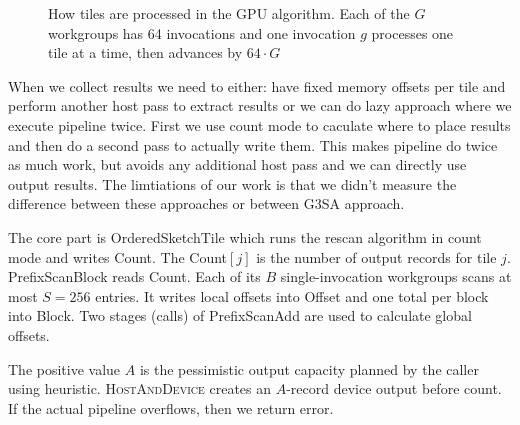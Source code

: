 \begin{figure}[H]
\caption{How tiles are processed in the GPU algorithm. Each of the $G$
workgroups has 64 invocations and one invocation $g$ processes one tile at a time, then
advances by $64\mathbin{\cdot}G$}
\label{fig:vulkan-tile-dispatch}
\end{figure}

When we collect results we need to either: have fixed memory offsets per tile and perform another host pass to extract results or we can do lazy approach where we execute pipeline twice. First we use count mode to caculate where to place results and then 
do a second pass to actually write them. This makes pipeline do twice as much work, but avoids any additional host pass and we can directly use output results. 
The limtiations of our work is that we didn't measure the difference between these approaches or between G3SA approach.

The core part is OrderedSketchTile which runs the rescan algorithm in count mode and writes Count.
The Count$[j]$ is the number of output records for
tile $j$. PrefixScanBlock reads Count.  Each of its $B$
single-invocation workgroups scans at most $S=256$ entries.  It writes
local offsets into Offset and one total per block into Block.
Two stages (calls) of PrefixScanAdd are used to calculate global offsets.

The positive value $A$ is the pessimistic output capacity planned by
the caller using heuristic. \textsc{HostAndDevice} creates an $A$-record device output before count. If the actual pipeline overflows, then we return error.

